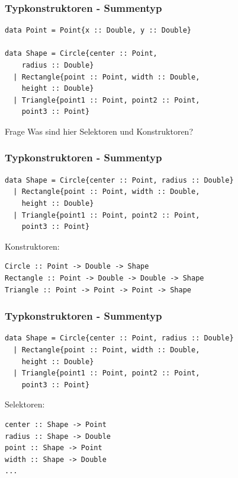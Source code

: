 \documentclass[fleqn,11pt,aspectratio=43]{beamer}
\begin{document}
\begin{frame}[fragile]
\frametitle{Typkonstruktoren - Summentyp} 
\begin{lstlisting}
data Point = Point{x :: Double, y :: Double}

data Shape = Circle{center :: Point, 
    radius :: Double}
  | Rectangle{point :: Point, width :: Double, 
    height :: Double}
  | Triangle{point1 :: Point, point2 :: Point, 
    point3 :: Point}
\end{lstlisting}

\begin{alertblock}{Frage}
Was sind hier Selektoren und Konstruktoren?
\end{alertblock}
\end{frame}

\begin{frame}[fragile]
\frametitle{Typkonstruktoren - Summentyp} 
\begin{lstlisting}
data Shape = Circle{center :: Point, radius :: Double}
  | Rectangle{point :: Point, width :: Double, 
    height :: Double}
  | Triangle{point1 :: Point, point2 :: Point, 
    point3 :: Point}
\end{lstlisting}
Konstruktoren: \pause
\begin{lstlisting}
Circle :: Point -> Double -> Shape
Rectangle :: Point -> Double -> Double -> Shape
Triangle :: Point -> Point -> Point -> Shape
\end{lstlisting}
\end{frame}

\begin{frame}[fragile]
\frametitle{Typkonstruktoren - Summentyp}
\begin{lstlisting}
data Shape = Circle{center :: Point, radius :: Double}
  | Rectangle{point :: Point, width :: Double, 
    height :: Double}
  | Triangle{point1 :: Point, point2 :: Point, 
    point3 :: Point}
\end{lstlisting} 
Selektoren: \pause
\begin{lstlisting}
center :: Shape -> Point
radius :: Shape -> Double
point :: Shape -> Point
width :: Shape -> Double
...
\end{lstlisting}
\end{frame}
\end{document}
